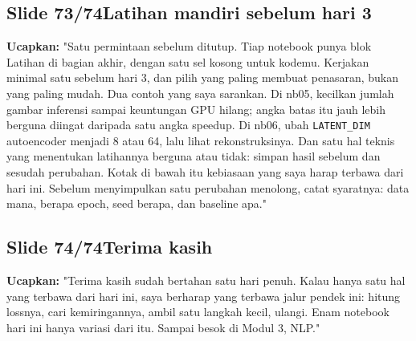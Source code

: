\documentclass[11pt]{article}
\renewcommand{\framebox}[1]{\colorbox{acc!15}{\textcolor{acc}{\textbf{#1}}}}
\begin{document}
\subsection*{\framebox{Slide 73/74}\quad Latihan mandiri sebelum hari 3}
\textbf{Ucapkan:} "Satu permintaan sebelum ditutup. Tiap notebook punya blok Latihan di bagian akhir, dengan satu sel kosong untuk kodemu. Kerjakan minimal satu sebelum hari 3, dan pilih yang paling membuat penasaran, bukan yang paling mudah. Dua contoh yang saya sarankan. Di nb05, kecilkan jumlah gambar inferensi sampai keuntungan GPU hilang; angka batas itu jauh lebih berguna diingat daripada satu angka speedup. Di nb06, ubah \texttt{LATENT\_DIM} autoencoder menjadi 8 atau 64, lalu lihat rekonstruksinya. Dan satu hal teknis yang menentukan latihannya berguna atau tidak: simpan hasil sebelum dan sesudah perubahan. Kotak di bawah itu kebiasaan yang saya harap terbawa dari hari ini. Sebelum menyimpulkan satu perubahan menolong, catat syaratnya: data mana, berapa epoch, seed berapa, dan baseline apa."\\[2pt]

\subsection*{\framebox{Slide 74/74}\quad Terima kasih}
\textbf{Ucapkan:} "Terima kasih sudah bertahan satu hari penuh. Kalau hanya satu hal yang terbawa dari hari ini, saya berharap yang terbawa jalur pendek ini: hitung lossnya, cari kemiringannya, ambil satu langkah kecil, ulangi. Enam notebook hari ini hanya variasi dari itu. Sampai besok di Modul 3, NLP."\\[2pt]
\end{document}
